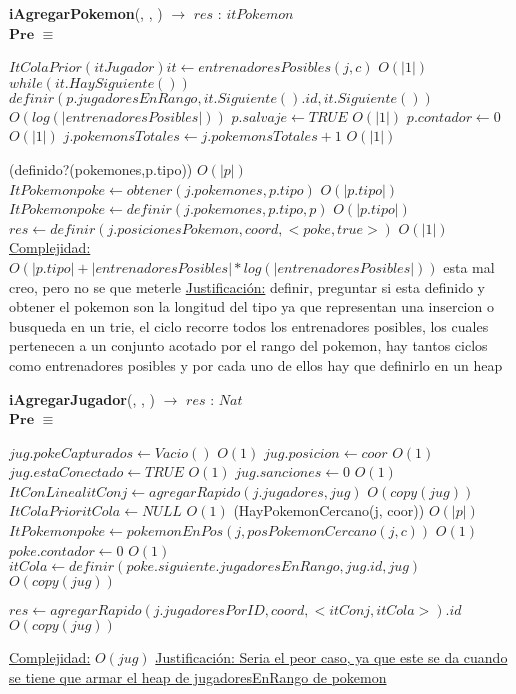 \begin{algorithm}[H]{\textbf{iAgregarPokemon}(, , ) $\to$ $res$ : $itPokemon$}
	{\\ $\textbf{Pre}$ $\equiv$ }
	\begin{algorithmic}
	
	\State $ItColaPrior(itJugador) it \gets entrenadoresPosibles(j,c) $ \Comment $O(|1|)$
	\State $while(it.HaySiguiente()) $ {
	\State $definir(p.jugadoresEnRango, it.Siguiente().id, it.Siguiente()) $ \Comment$O(log(|entrenadoresPosibles|))$
	 }
	\State $p.salvaje \gets TRUE $ \Comment $O(|1|)$
	\State $p.contador \gets 0 $ \Comment $O(|1|)$
	\State $j.pokemonsTotales \gets j.pokemonsTotales+1 $ \Comment $O(|1|)$
	
	\If(definido?(pokemones,p.tipo)) \Comment $O(|p|)$
	\State $ItPokemon poke \gets obtener(j.pokemones,p.tipo) $ \Comment $O(|p.tipo|)$
	\Else
	\State $ItPokemon poke \gets definir(j.pokemones,p.tipo, p)$ \Comment $O(|p.tipo|)$
	\EndIf
	\State $res \gets definir(j.posicionesPokemon, coord, <poke,true>) $ \Comment $O(|1|)$
		\medskip
		\Statex \underline{Complejidad:} $O(|p.tipo| + |entrenadoresPosibles| * log(|entrenadoresPosibles|))$
		 esta mal creo, pero no se que meterle
		\Statex \underline{Justificación:}  definir, preguntar si esta definido 
		y obtener el pokemon son la longitud del tipo ya que representan una insercion 
		o busqueda en un trie, el ciclo recorre todos los entrenadores posibles, 
		los cuales pertenecen a un conjunto acotado por el rango del pokemon, 
		hay tantos ciclos como entrenadores posibles y por cada uno de ellos 
		hay que definirlo en un heap 
    \end{algorithmic}
\end{algorithm}

\begin{algorithm}[H]{\textbf{iAgregarJugador}(, , ) $\to$ $res$ : $Nat$}
	{\\ $\textbf{Pre}$ $\equiv$ }
	\begin{algorithmic}
	\State $jug.pokeCapturados \gets Vacio() $ \Comment $O(1)$
	\State $jug.posicion \gets coor $ \Comment $O(1)$
	\State $jug.estaConectado \gets TRUE $ \Comment $O(1)$
	\State $jug.sanciones \gets 0 $ \Comment $O(1)$
	\State $ItConLineal itConj \gets agregarRapido(j.jugadores,jug) $ \Comment $O(copy(jug))$
	\State $ItColaPrior itCola \gets NULL $ \Comment $O(1)$
	\If(HayPokemonCercano(j, coor)) \Comment $O(|p|)$
	\State $ItPokemon poke \gets pokemonEnPos(j,posPokemonCercano(j,c))$ \Comment $O(1)$
	\State $poke.contador \gets 0$ \Comment $O(1)$
	\State $ itCola \gets definir(poke.siguiente.jugadoresEnRango,jug.id,jug) $ \Comment $O(copy(jug))$
	\EndIf
	
	\State $res \gets agregarRapido(j.jugadoresPorID, coord, <itConj,itCola>).id $ \Comment $O(copy(jug))$

	
	
		\medskip
		\Statex \underline{Complejidad:} $O(jug)$
		\Statex \underline{Justificación: Seria el peor caso, ya que este se da cuando se tiene que armar el heap de jugadoresEnRango de pokemon}  
    \end{algorithmic}
\end{algorithm}

